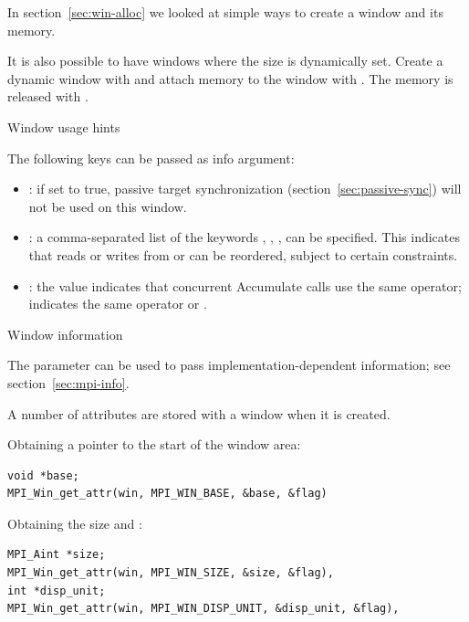 In section~\ref{sec:win-alloc} we looked at simple ways to create a
window and its memory.

It is also possible to have windows where the size is dynamically set.
Create a dynamic window with
and attach
memory to the window with
%
.
%
The memory is released with
%
.

 {Window usage hints}
\label{sec:window-info}

The following keys can be passed as info argument:
\begin{itemize}
\item {}: if set to true, passive target synchronization
  (section~\ref{sec:passive-sync}) will not be used on this window.
\item {}: a comma-separated list of
  the keywords , ,
  ,  can be specified. This
  indicates that reads or writes from  or
   can be reordered, subject to
  certain constraints.
\item {}: the value 
  indicates that concurrent Accumulate calls use the same operator;
   indicates the same operator or
  .
\end{itemize}

 {Window information}
\label{sec:win-attr}

The  parameter can be used to pass implementation-dependent 
information; see section~\ref{sec:mpi-info}.

A number of attributes are stored with a window when it is created.

Obtaining a pointer to the start of the window area:
\begin{lstlisting}
void *base;
MPI_Win_get_attr(win, MPI_WIN_BASE, &base, &flag)  
\end{lstlisting}

Obtaining the size and :
\begin{lstlisting}
MPI_Aint *size;
MPI_Win_get_attr(win, MPI_WIN_SIZE, &size, &flag), 
int *disp_unit;
MPI_Win_get_attr(win, MPI_WIN_DISP_UNIT, &disp_unit, &flag), 
\end{lstlisting}

